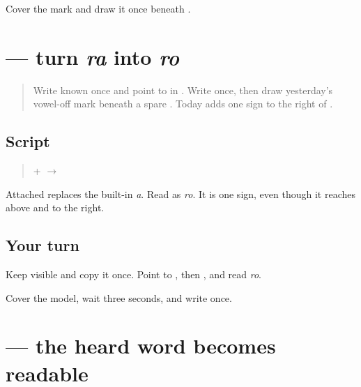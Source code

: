 \begin{tcolorbox}[breakable,colback=teal!4,colframe=teal!35!black,title={Before you move on}]
Cover the mark and draw it once beneath \textbf{}.
\end{tcolorbox}
\section[\texorpdfstring{\mw{ो} (o-mātrā)}{ो (o-mātrā)}]{ — turn \emph{ra} into \emph{ro}}

\label{lesson:MW-W05-o-matra}



\begin{quote}
Write known \textbf{} once and point to \textbf{} in \textbf{}. Write \textbf{} once, then draw yesterday's vowel-off mark beneath a spare \textbf{}. Today adds one sign to the right of \textbf{}.
\end{quote}

\subsection*{Script}

\begin{quote}
 +  $\to$ 
\end{quote}

Attached \textbf{} replaces the built-in \emph{a}. Read \textbf{} as \emph{ro}. It is one sign, even though it reaches above and to the right.

\subsection*{Your turn}
Keep \textbf{} visible and copy it once. Point to \textbf{}, then \textbf{}, and read \emph{ro}.

\begin{tcolorbox}[breakable,colback=teal!4,colframe=teal!35!black,title={Before you move on}]
Cover the model, wait three seconds, and write \textbf{} once.
\end{tcolorbox}
\section[\texorpdfstring{\mw{म्हारो} (mhāro)}{म्हारो (mhāro)}]{ — the heard word becomes readable}

